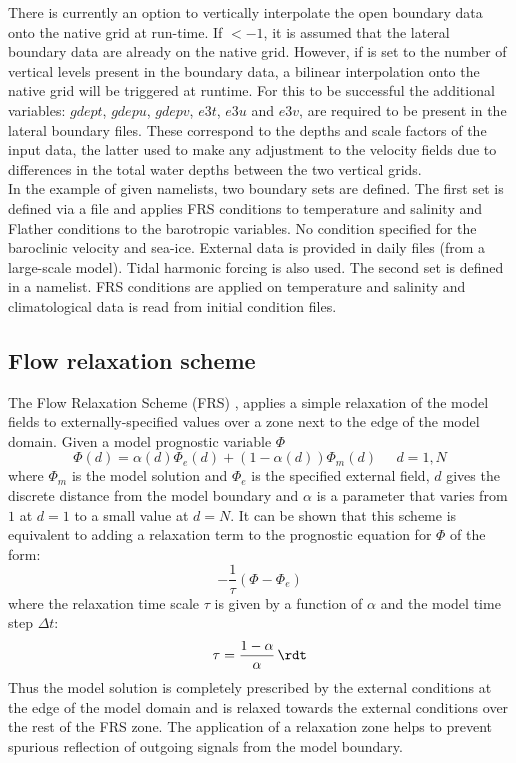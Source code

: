 \documentclass[../main/NEMO_manual]{subfiles}
\begin{document}
There is currently an option to vertically interpolate the open boundary data onto the native grid at run-time.
If $<-1$, it is assumed that the lateral boundary data are already on the native grid.
However, if  is set to the number of vertical levels present in the boundary data,
a bilinear interpolation onto the native grid will be triggered at runtime.
For this to be successful the additional variables: $gdept$, $gdepu$, $gdepv$, $e3t$, $e3u$ and $e3v$, are required to be present in the lateral boundary files.
These correspond to the depths and scale factors of the input data,
the latter used to make any adjustment to the velocity fields due to differences in the total water depths between the two vertical grids.\\

In the example of given namelists, two boundary sets are defined.
The first set is defined via a file and applies FRS conditions to temperature and salinity and
Flather conditions to the barotropic variables. No condition specified for the baroclinic velocity and sea-ice.
External data is provided in daily files (from a large-scale model).
Tidal harmonic forcing is also used.
The second set is defined in a namelist.
FRS conditions are applied on temperature and salinity and climatological data is read from initial condition files.

\subsection{Flow relaxation scheme}
\label{subsec:LBC_bdy_FRS_scheme}

The Flow Relaxation Scheme (FRS) \citep{davies_QJRMS76,engedahl_T95},
applies a simple relaxation of the model fields to externally-specified values over
a zone next to the edge of the model domain.
Given a model prognostic variable $\Phi$
\[
  \Phi(d) = \alpha(d)\Phi_{e}(d) + (1-\alpha(d))\Phi_{m}(d)\;\;\;\;\; d=1,N
\]
where $\Phi_{m}$ is the model solution and $\Phi_{e}$ is the specified external field,
$d$ gives the discrete distance from the model boundary and
$\alpha$ is a parameter that varies from $1$ at $d=1$ to a small value at $d=N$.
It can be shown that this scheme is equivalent to adding a relaxation term to
the prognostic equation for $\Phi$ of the form:
\[
  -\frac{1}{\tau}\left(\Phi - \Phi_{e}\right)
\]
where the relaxation time scale $\tau$ is given by a function of $\alpha$ and the model time step $\Delta t$:
\[
  \tau = \frac{1-\alpha}{\alpha}  \,\rdt
\]
Thus the model solution is completely prescribed by the external conditions at the edge of the model domain and
is relaxed towards the external conditions over the rest of the FRS zone.
The application of a relaxation zone helps to prevent spurious reflection of
outgoing signals from the model boundary.
\end{document}
